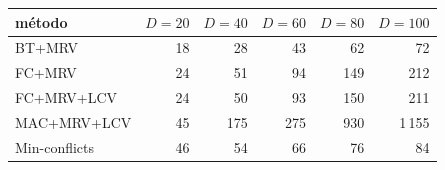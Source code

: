 \begin{tabular}{lrrrrr}
\toprule
método & $D=20$ & $D=40$ & $D=60$ & $D=80$ & $D=100$ \\
\midrule
BT+MRV & 18 & 28 & 43 & 62 & 72 \\
FC+MRV & 24 & 51 & 94 & 149 & 212 \\
FC+MRV+LCV & 24 & 50 & 93 & 150 & 211 \\
MAC+MRV+LCV & 45 & 175 & 275 & 930 & 1\,155 \\
Min-conflicts & 46 & 54 & 66 & 76 & 84 \\
\bottomrule
\end{tabular}
